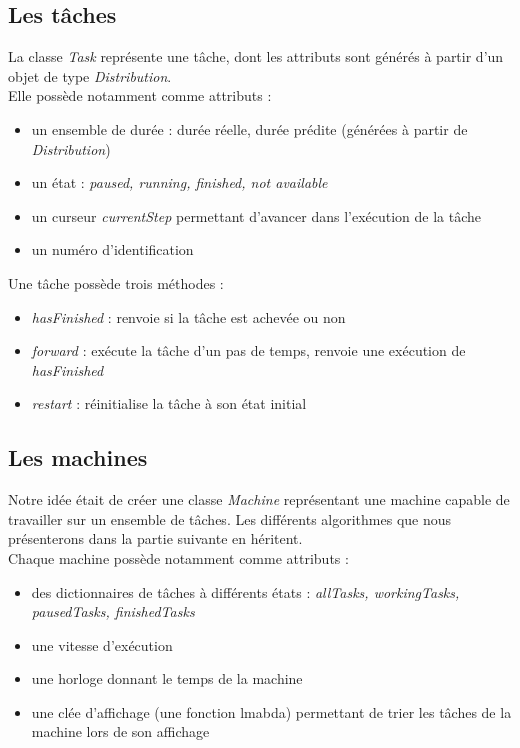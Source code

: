 \documentclass[12pt]{article}
\begin{document}

\subsection{Les tâches}
La classe \emph{Task} représente une tâche, dont les attributs sont générés à partir d'un objet de type \emph{Distribution}. \\

Elle possède notamment comme attributs :
\begin{itemize}
	\item un ensemble de durée : durée réelle, durée prédite (générées à partir de \emph{Distribution})
	\item un état : \emph{paused, running, finished, not available}
	\item un curseur \emph{currentStep} permettant d'avancer dans l'exécution de la tâche
	\item un numéro d'identification 
\end{itemize}

Une tâche possède trois méthodes :
\begin{itemize}
	\item \emph{hasFinished} : renvoie si la tâche est achevée ou non
	\item \emph{forward} : exécute la tâche d'un pas de temps, renvoie une exécution de \emph{hasFinished}
	\item \emph{restart} : réinitialise la tâche à son état initial
\end{itemize}

\subsection{Les machines}
Notre idée était de créer une classe \emph{Machine} représentant une machine capable de travailler sur un ensemble de tâches. Les différents algorithmes que nous présenterons dans la partie suivante en héritent. \\

Chaque machine possède notamment comme attributs :
\begin{itemize}
	\item des dictionnaires de tâches à différents états : \emph{allTasks, workingTasks, pausedTasks, finishedTasks}
	\item une vitesse d'exécution
	\item une horloge donnant le temps de la machine
	\item une clée d'affichage (une fonction lmabda) permettant de trier les tâches de la machine lors de son affichage
\end{itemize}
\end{document}
